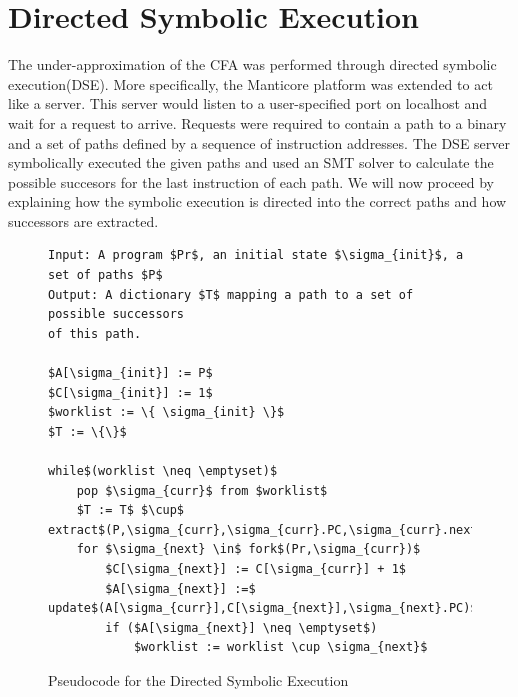 \documentclass{kththesis}
\newcommand{\fbcomment}[1]{{#1}}
\renewcommand{\fbcomment}[1]{}
\begin{document}
\section{Directed Symbolic Execution}\label{sec:DSEPseudo}
\fbcomment{\color{red}Goal: Describe the theory behind how the directed symbolic execution was performed and how successor to locations were extracted.}
The under-approximation of the CFA was performed through directed symbolic execution(DSE). More specifically, the Manticore platform was extended to act like a server. This server would listen to a user-specified port on localhost and wait for a request to arrive. Requests were required to contain a path to a binary and a set of paths defined by a sequence of instruction addresses. The DSE server symbolically executed the given paths and used an SMT solver to calculate the possible succesors for the last instruction of each path. We will now proceed by explaining how the symbolic execution is directed into the correct paths and how successors are extracted.
\begin{figure}[!htbp]
    \centering
\begin{algorithmFrame}
\begin{lstlisting}[style=algorithm]
Input: A program $Pr$, an initial state $\sigma_{init}$, a set of paths $P$
Output: A dictionary $T$ mapping a path to a set of possible successors 
of this path.

$A[\sigma_{init}] := P$
$C[\sigma_{init}] := 1$
$worklist := \{ \sigma_{init} \}$
$T := \{\}$

while$(worklist \neq \emptyset)$
    pop $\sigma_{curr}$ from $worklist$
    $T := T$ $\cup$ extract$(P,\sigma_{curr},\sigma_{curr}.PC,\sigma_{curr}.nextPC,C[\sigma_{curr}])$
    for $\sigma_{next} \in$ fork$(Pr,\sigma_{curr})$
        $C[\sigma_{next}] := C[\sigma_{curr}] + 1$
        $A[\sigma_{next}] :=$ update$(A[\sigma_{curr}],C[\sigma_{next}],\sigma_{next}.PC)$
        if ($A[\sigma_{next}] \neq \emptyset$)
            $worklist := worklist \cup \sigma_{next}$
\end{lstlisting}
\end{algorithmFrame}
\caption[Pseudocode for the Directed Symbolic Execution]{Pseudocode for the Directed Symbolic Execution}
    \label{fig:DSEAlgorithm}
\end{figure}
\end{document}
